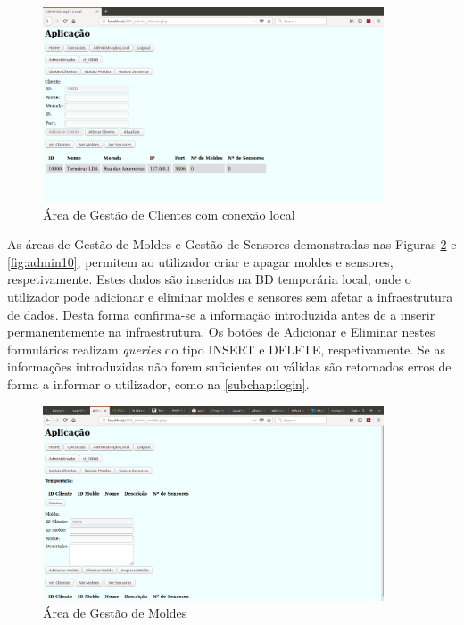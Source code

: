 \documentclass[11pt,twoside,a4paper]{report}
\begin{document}
\newpage
\begin{figure}[H]
	\begin{center}
		\includegraphics[trim={0 1.5cm 0 0},clip,width=0.9\textwidth]{administracao04} %
		\caption{Área de Gestão de Clientes com conexão local}
		\label{fig:admin4}
	\end{center}
\end{figure}
\vspace{-1cm}
As áreas de Gestão de Moldes e Gestão de Sensores demonstradas nas Figuras \ref{fig:admin9} e \ref{fig:admin10}, permitem ao utilizador criar e apagar moldes e sensores, respetivamente. Estes dados são inseridos na BD temporária local, onde o utilizador pode adicionar e eliminar moldes e sensores sem afetar a infraestrutura de dados. Desta forma confirma-se a informação introduzida antes de a inserir permanentemente na infraestrutura. Os botões de Adicionar e Eliminar nestes formulários realizam \textit{queries} do tipo INSERT e DELETE, respetivamente. Se as informações introduzidas não forem suficientes ou válidas são retornados erros de forma a informar o utilizador, como na \autoref{subchap:login}.
\begin{figure}[H]
	\centering
		\includegraphics[width=0.9\textwidth]{administracao05} %
		\caption{Área de Gestão de Moldes}
		\label{fig:admin9}
\end{figure}
\end{document}
